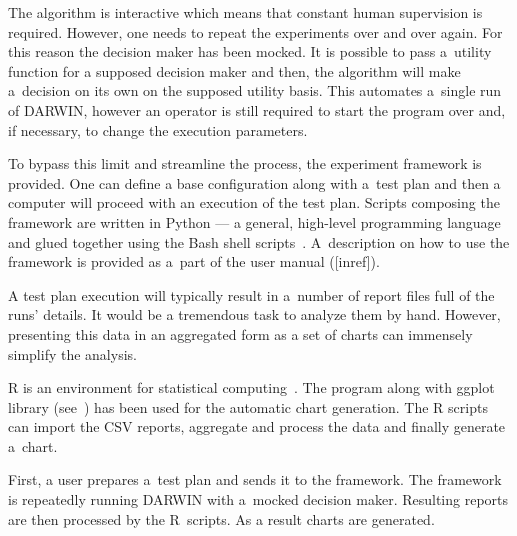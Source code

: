 The algorithm is interactive which means that constant human supervision is
required. However, one needs to repeat the experiments over and over
again. For this reason the decision maker has been mocked. It is possible to
pass a~utility function for a supposed decision maker and then, the algorithm
will make a~decision on its own on the supposed utility basis. This automates
a~single run of DARWIN, however an operator is still required to start the
program over and, if necessary, to change the execution parameters.

To bypass this limit and streamline the process, the experiment framework is
provided. One can define a base configuration along with a~test plan and then
a computer will proceed with an execution of the test plan. Scripts composing
the framework are written in Python --- a general, high-level programming
language~\cite{Pyt} and glued together using the Bash shell
scripts~\cite{Bas}. A~description on how to use the framework is provided as
a~part of the user manual ([inref]).

A test plan execution will typically result in a~number of report files full
of the runs' details. It would be a tremendous task to analyze them by
hand. However, presenting this data in an aggregated form as a set of charts
can immensely simplify the analysis.

R is an environment for statistical computing~\cite{R}. The program along with
ggplot library (see~\cite{Wic09}) has been used for the automatic chart
generation. The R scripts can import the CSV reports, aggregate and process
the data and finally generate a~chart.

First, a user prepares a~test plan and sends it to the framework. The
framework is repeatedly running DARWIN with a~mocked decision maker. Resulting
reports are then processed by the R~scripts. As a result charts are generated.


